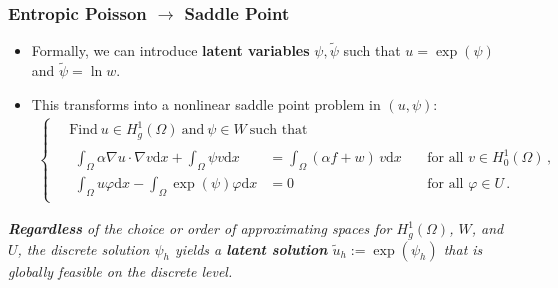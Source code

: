 \documentclass[aspectratio=169,xcolor=dvipsnames,11pt]{beamer}
\newcommand{\dd}{\mathrm{d}}
\newcommand{\fa}{\text{for all }}
\begin{document}
\begin{frame}\frametitle{Entropic Poisson $\rightarrow$ Saddle Point}
\begin{itemize}
\item
Formally, we can introduce \textbf{latent variables} $\psi, \widetilde{\psi}$ such that $u = \exp(\psi)$ and $\widetilde{\psi} = \ln w$. \pause
\item This transforms \label{eq:EPEIntro} into a nonlinear saddle point problem in $(u,\psi)$:
		\begin{gather*}
			\left\{
			\begin{aligned}
				\,&\text{Find}~
				u\in H^1_g(\Omega) ~\text{and}~\psi \in W
				~\text{such that~}
				\\
				&\begin{alignedat}{4}
					\int_\Omega \alpha \nabla u\cdot \nabla v \dd x + \int_\Omega \psi v \dd x &= \int_\Omega (\alpha f + w)\, v \dd x
					&&~\fa v \in H^1_0(\Omega)
					\,,
					\\
					\int_\Omega u \varphi \dd x - \int_\Omega \exp(\psi) \varphi \dd x &= 0
					&&~\fa \varphi \in U
					\,.
				\end{alignedat}
			\end{aligned}
			\right.
		\end{gather*} 
\end{itemize}\pause
\begin{center}
\textit{
\textbf{Regardless} of the choice or order of approximating spaces for $H^1_g(\Omega)$, $W$, and $U$, the discrete solution $\psi_h$ yields a \textbf{latent solution} $\widetilde{u}_h := \exp(\psi_h)$ 
that is globally feasible on the discrete level.
}
\end{center}
\end{frame}
\end{document}
